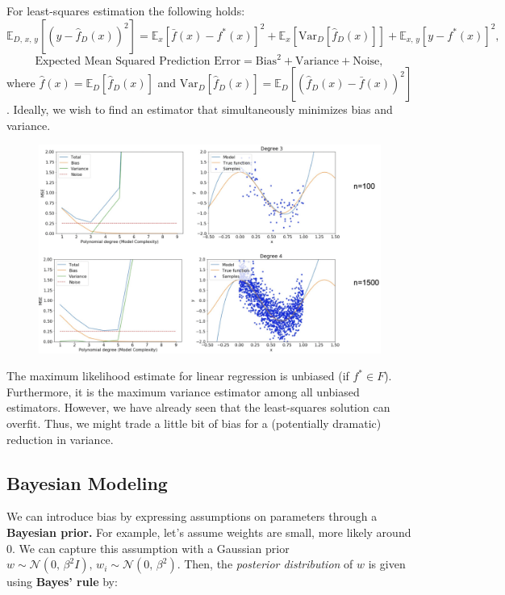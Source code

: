 \documentclass[a4paper]{extarticle}
\begin{document}
For least-squares estimation the following holds:
\[
    \mathbb{E}_{D, \, x, \, y}[(y - \hat{f}_D(x))^2] = \mathbb{E}_x[\bar{f}(x) - f^*(x)]^2 + \mathbb{E}_x[\text{Var}_D[\hat{f}_D(x)]] + \mathbb{E}_{x, \, y}[y - f^*(x)]^2,
\]
\[
    \text{Expected Mean Squared Prediction Error} = \text{Bias}^2 + \text{Variance} + \text{Noise},
\]
where $\hat{f}(x) = \mathbb{E}_D[\hat{f}_D(x)]$ and $\text{Var}_D[\hat{f}_D(x)] = \mathbb{E}_D[(\hat{f}_D(x) - \bar{f}(x))^2]$.
Ideally, we wish to find an estimator that simultaneously minimizes bias and variance.

\begin{figure}[H]
    \includegraphics[width=15cm]{../images/IntroML_Fig10-4}
    \centering
\end{figure}

The maximum likelihood estimate for linear regression is unbiased (if $f^* \in F$). Furthermore, it is the maximum variance estimator among all unbiased estimators. However, we have already seen that the least-squares solution can overfit.
Thus, we might trade a little bit of bias for a (potentially dramatic) reduction in variance.

\subsection{Bayesian Modeling}

We can introduce bias by expressing assumptions on parameters through a \textbf{Bayesian prior.} For example, let's assume weights are small, more likely around $0$. We can capture this assumption with a Gaussian prior $w \sim \mathcal{N}(0, \, \beta^2I), \, w_i \sim \mathcal{N}(0, \, \beta^2)$. Then, the \textit{posterior distribution} of $w$ is given using \textbf{Bayes' rule} by:
\end{document}
